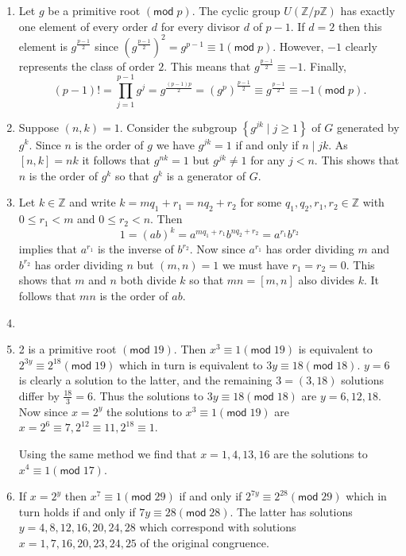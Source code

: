 \documentclass[12pt]{article}
\renewcommand{\pmod}[1]{\left(\mathsf{mod}\;#1\right)}
\begin{document}
\begin{enumerate}
\item Let $g$ be a primitive root $\pmod{p}$.
The cyclic group $U\left(\mathbb{Z}/p\mathbb{Z}\right)$
has exactly one element of every order $d$ for every divisor
$d$ of $p-1$. If $d=2$ then this element is $g^{\frac{p-1}{2}}$
since $\left(g^{\frac{p-1}{2}}\right)^2=g^{p-1}\equiv 1\pmod{p}$.
However, $-1$ clearly represents the class of order $2$.
This means that $g^{\frac{p-1}{2}}\equiv -1$.
Finally,
\[\left(p-1\right)!=\prod_{j=1}^{p-1}g^j
=g^{\frac{\left(p-1\right)p}{2}}
=\left(g^p\right)^{\frac{p-1}{2}}
\equiv g^{\frac{p-1}{2}}
\equiv -1\pmod{p}.\]

\item\label{CyclicGenerators} %
Suppose $\left(n,k\right)=1$.
Consider the subgroup 
$\left\{g^{jk}\mid j\ge 1\right\}$
of $G$ generated by $g^k$.
Since $n$ is the order of $g$ we have $g^{jk}=1$
if and only if $n\mid jk$. As $\left[n,k\right]=nk$
it follows that $g^{nk}=1$ but $g^{jk}\ne 1$ for any $j<n$.
This shows that $n$ is the order of $g^k$
so that $g^k$ is a generator of $G$.

\item %
Let $k\in\mathbb{Z}$ and write $k=mq_1+r_1=nq_2+r_2$ for
some $q_1,q_2,r_1,r_2\in\mathbb{Z}$ with $0\le r_1<m$ and $0\le r_2<n$. Then 
\[1=\left(ab\right)^k=a^{mq_1+r_1}b^{nq_2+r_2}=a^{r_1}b^{r_2}\]
implies that $a^{r_1}$ is the inverse of $b^{r_2}$.
Now since $a^{r_1}$ has order dividing $m$ and $b^{r_2}$
has order dividing $n$ but $\left(m,n\right)=1$ we must
have $r_1=r_2=0$. This shows that $m$ and $n$ both divide $k$
so that $mn=\left[m,n\right]$ also divides $k$. It follows
that $mn$ is the order of $ab$.

\item %

\item %
2 is a primitive root $\pmod{19}$. Then $x^3\equiv 1\pmod{19}$
is equivalent to $2^{3y}\equiv 2^{18}\pmod{19}$
which in turn is equivalent to $3y\equiv 18\pmod{18}$.
$y=6$ is clearly a solution to the latter, and the remaining
$3=\left(3,18\right)$ solutions differ by $\frac{18}{3}=6$.
Thus the solutions to $3y\equiv 18\pmod{18}$ are $y=6,12,18$.
Now since $x=2^y$ the solutions to $x^3\equiv 1\pmod{19}$
are $x=2^6\equiv 7,
2^{12}\equiv 11,2^{18}\equiv 1$. 

Using the same method we find that $x=1,4,13,16$ are the solutions
to $x^4\equiv 1\pmod{17}$.

\item\label{X7E29} %
If $x=2^y$ then $x^7\equiv 1\pmod{29}$ if and only
if $2^{7y}\equiv 2^{28}\pmod{29}$ which in turn holds
if and only if $7y\equiv 28\pmod{28}$. The latter has solutions
$y=4,8,12,16,20,24,28$ which correspond with solutions
$x=1,7,16,20,23,24,25$ of the original congruence.


\end{enumerate}
\end{document}
